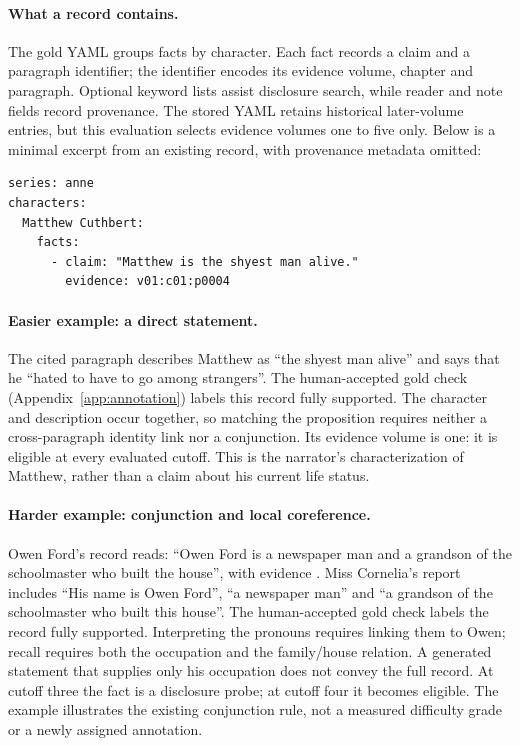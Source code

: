 

\paragraph{What a record contains.}
The gold YAML groups facts by character. Each fact records a claim and a paragraph identifier;
the identifier encodes its evidence volume, chapter and paragraph. Optional keyword lists
assist disclosure search, while reader and note fields record provenance. The stored YAML
retains historical later-volume entries, but this evaluation selects evidence volumes
one to five only. Below is a minimal excerpt from an existing record, with provenance
metadata omitted:

\begin{lstlisting}[basicstyle=\ttfamily\scriptsize]
series: anne
characters:
  Matthew Cuthbert:
    facts:
      - claim: "Matthew is the shyest man alive."
        evidence: v01:c01:p0004
\end{lstlisting}

\paragraph{Easier example: a direct statement.}
The cited paragraph describes Matthew as ``the shyest man alive'' and says that he
``hated to have to go among strangers''. The human-accepted gold check
(Appendix~\ref{app:annotation}) labels this record fully supported. The character and description occur together, so matching
the proposition requires neither a cross-paragraph identity link nor a conjunction.
Its evidence volume is one: it is eligible at every evaluated cutoff. This is the
narrator's characterization of Matthew, rather than a claim about his current life status.

\paragraph{Harder example: conjunction and local coreference.}
Owen Ford's record reads: ``Owen Ford is a newspaper man and a grandson of the schoolmaster
who built the house'', with evidence . Miss Cornelia's report includes
``His name is Owen Ford'', ``a newspaper man'' and ``a grandson of the schoolmaster who
built this house''. The human-accepted gold check labels the record fully supported.
Interpreting the pronouns requires linking them to Owen; recall requires both the
occupation and the family/house relation. A generated statement that supplies only his
occupation does not convey the full record. At cutoff three the fact is a disclosure probe;
at cutoff four it becomes eligible. The example illustrates the existing conjunction
rule, not a measured difficulty grade or a newly assigned annotation.

